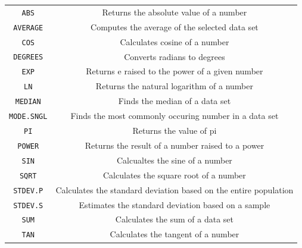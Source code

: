 \begin{center}
\begin{tabular}{c | c}
\texttt{ABS} & Returns the absolute value of a number \\
\texttt{AVERAGE} & Computes the average of the selected data set \\
\texttt{COS} & Calculates cosine of a number\\
\texttt{DEGREES} & Converts radians to degrees \\
\texttt{EXP} & Returns e raised to the power of a given number \\
\texttt{LN} & Returns the natural logarithm of a number \\
\texttt{MEDIAN} & Finds the median of a data set \\
\texttt{MODE.SNGL} & Finds the most commonly occuring number in a data set\\
\texttt{PI} & Returns the value of pi\\
\texttt{POWER} & Returns the result of a number raised to a power\\
\texttt{SIN} & Calcualtes the sine of a number\\
\texttt{SQRT} & Calculates the square root of a number\\
\texttt{STDEV.P} & Calculates the standard deviation based on the entire population \\
\texttt{STDEV.S} & Estimates the standard deviation based on a sample \\
\texttt{SUM} & Calculates the sum of a data set\\
\texttt{TAN} & Calculates the tangent of a number
\end{tabular}
\end{center}


